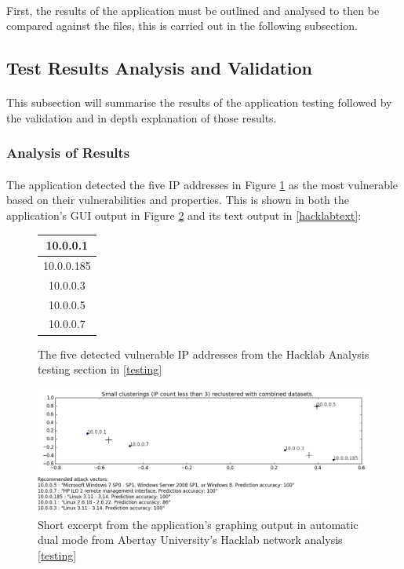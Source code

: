 \paragraph{}First, the results of the application must be outlined and analysed to then be compared against the files, this is carried out in the following subsection.
\subsection{Test Results Analysis and Validation}
\label{testresults}

\paragraph{}This subsection will summarise the results of the application testing followed by the validation and in depth explanation of those results.

\subsubsection{Analysis of Results}

\paragraph{}The application detected the five IP addresses in Figure \ref{ips} as the most vulnerable based on their vulnerabilities and properties. This is shown in both the application’s GUI output in Figure \ref{results} and its text output in \ref{hacklabtext}: 

\begin{figure}
\label{ips}
\begin{center}
\begin{tabular}{ |c| }
\hline
10.0.0.1\\ \hline
10.0.0.185\\ \hline
10.0.0.3\\ \hline
10.0.0.5\\ \hline
10.0.0.7\\ \hline
\end{tabular}
\end{center}
\caption{The five detected vulnerable IP addresses from the Hacklab Analysis testing section in \ref{testing}}
\end{figure}


\begin{figure}[!h]
\centering
\includegraphics[width=6in]{./Figures/results.png}
\caption{Short excerpt from the application’s graphing output in automatic dual mode from Abertay University’s Hacklab network analysis \ref{testing}}
\label{results}
\end{figure}

